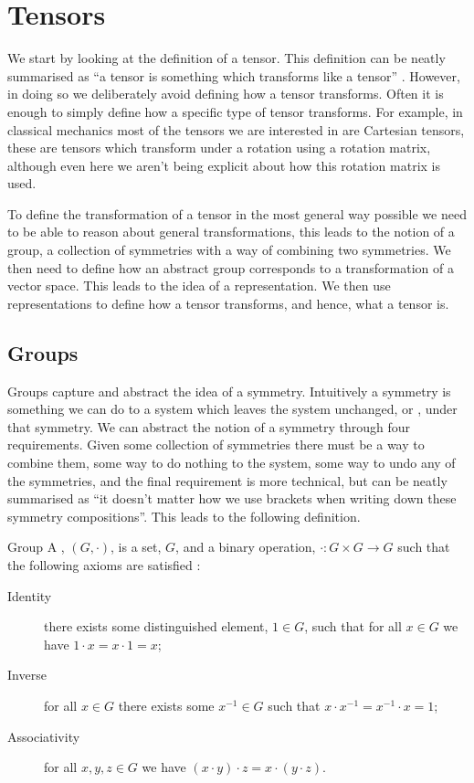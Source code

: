 \documentclass[fleqn]{NotesClass}
\newcommand{\identity}{1}
\begin{document}
    \chapter{Tensors}
    We start by looking at the definition of a tensor.
    This definition can be neatly summarised as \enquote{a tensor is something which transforms like a tensor} \cite[52]{zee}.
    However, in doing so we deliberately avoid defining how a tensor transforms.
    Often it is enough to simply define how a specific type of tensor transforms.
    For example, in classical mechanics most of the tensors we are interested in are Cartesian tensors, these are tensors which transform under a rotation using a rotation matrix, although even here we aren't being explicit about how this rotation matrix is used.
    
    To define the transformation of a tensor in the most general way possible we need to be able to reason about general transformations, this leads to the notion of a group, a collection of symmetries with a way of combining two symmetries.
    We then need to define how an abstract group corresponds to a transformation of a vector space.
    This leads to the idea of a representation.
    We then use representations to define how a tensor transforms, and hence, what a tensor is.
    
    \section{Groups}
    Groups capture and abstract the idea of a symmetry.
    Intuitively a symmetry is something we can do to a system which leaves the system unchanged, or , under that symmetry.
    We can abstract the notion of a symmetry through four requirements.
    Given some collection of symmetries there must be a way to combine them, some way to do nothing to the system, some way to undo any of the symmetries, and the final requirement is more technical, but can be neatly summarised as \enquote{it doesn't matter how we use brackets when writing down these symmetry compositions}.
    This leads to the following definition.
    
    \begin{dfn}{Group}{}
        A , \((G, \cdot)\), is a set, \(G\), and a binary operation, \(\cdot \colon G \times G \to G\) such that the following axioms are satisfied \cite{riley-hobson-bence}:
        \begin{description}
            \item[Identity] there exists some distinguished element, \(\identity \in G\), such that for all \(x \in G\) we have \(\identity \cdot x = x \cdot \identity = x\);
            \item[Inverse] for all \(x \in G\) there exists some \(x^{-1} \in G\) such that \(x \cdot x^{-1} = x^{-1} \cdot x = \identity\);
            \item[Associativity] for all \(x, y, z \in G\) we have \((x \cdot y) \cdot z = x \cdot (y \cdot z)\).
        \end{description}
    \end{dfn}
    
\end{document}
